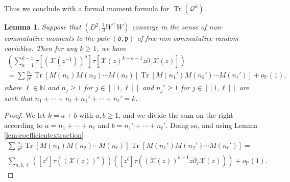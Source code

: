 \documentclass[letterpaper, 10pt, dvipsnames]{article}
\numberwithin{equation}{section}
\DeclareMathOperator{\Tr}{Tr}
\newcommand{\N}{\mathbb{N}}
\newcommand{\Q}{\mathcal{Q}}
\renewcommand{\P}{\mathds{P}}
\newcommand{\unn}[2]{[\![#1,#2]\!]}
\newtheorem{lem}[ccounter]{Lemma}
\theoremstyle{definition}
\begin{document}
Thus we conclude with a formal moment formula for $\Tr(\Q^k).$ 
\begin{lem}\label{lem:coefficientextraction2}
  Suppose that $(D^2, \tfrac{1}{d}W^{\top}W)$ converge in the sense of non-commutative moments to the pair $(\mathfrak{d}, \mathfrak{p})$ of free non-commutative random variables.  Then for any $k \geq 1$, we have 
  \begin{multline*}
  [z^0] 
  \left( 
    \sum_{a=1}^{k-1}
    \tau[ \left( \mathcal{X}(z^{-1}) \right)^a ]\tau[ \mathcal{X}(z)^{k-a-1} z \partial_z \mathcal{X}(z) ]
  \right)
  \\=\sum \frac{n_1}{p^2} \Tr[ M(n_1)M(n_2)\cdots M(n_\ell)]\Tr[M(n_1')M(n_2')\cdots M(n_\ell')] + o_{\P}(1),
  \end{multline*}
  where $\ell \in \N$ and $n_j \geq 1$ for $j \in \unn{1}{\ell}$ and $n_j' \geq 1$ for $j \in \unn{1}{\ell}$ are such that $n_1+\cdots+n_\ell+ n_1'+\cdots+n_\ell'=k$.
\end{lem}
\begin{proof}
  We let $k = a+b$ with $a,b \geq 1$, and we divide the sum on the right according to $a= n_1+\cdots+n_\ell$ and $b= n_1'+\cdots+n_\ell'$.  Doing so, and using Lemma \ref{lem:coefficientextraction}
  \begin{multline*}
  \sum \frac{n_1}{p^2} \Tr[ M(n_1)M(n_2)\cdots M(n_\ell)]\Tr[M(n_1')M(n_2')\cdots M(n_\ell')]
  =\\
  \sum_{a,b,\ell} 
  \left(
    [z^\ell]\tau(\left( \mathcal{X}(z) \right)^a)
  \right)
  \left(
    [z^\ell]\tau(\left( \mathcal{X}(z) \right)^{b-1} z \partial_z \mathcal{X}(z))
  \right) + o_{\P}(1).
  \end{multline*}
\end{proof}
\end{document}
